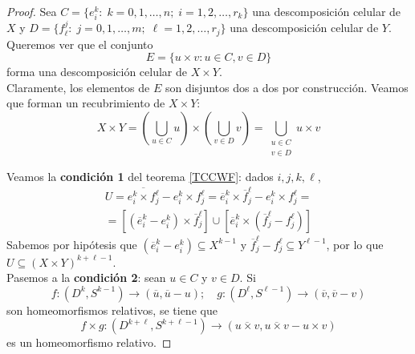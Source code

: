 \begin{proof}
Sea $C=\{e_i^k:\; k=0,1,\dots,n; \;i=1,2,\dots,r_k\}$ una descomposición celular de $X$ y $D=\{f_\ell^j:\; j=0,1,\dots,m; \;\ell=1,2,\dots,r_j\}$ una descomposición celular de $Y$. Queremos ver que el conjunto $$E=\{u\times v: u\in C, v\in D\}$$ forma una descomposición celular de $X\times Y$.
\\

Claramente, los elementos de $E$ son disjuntos dos a dos por construcción. Veamos que forman un recubrimiento de $X\times Y$: $$X\times Y=\left(\bigcup_{u \in C}u\right)\times\left(\bigcup_{v \in D}v\right)=\bigcup_{\substack{u \in C\\v \in D}}u\times v$$

Veamos la \textbf{condición 1} del teorema \ref{TCCWF}: dados $i,j,k,\ell$, \begin{multline*}
U=\overline{e^k_i\times f^\ell_j}-e^k_i\times f^\ell_j=\overline{e}^k_i\times \overline{f}^\ell_j-e^k_i\times f^\ell_j=\\=[(\overline{e}^k_i-e^k_i)\times \overline{f}^\ell_j]\cup[\overline{e}^k_i\times (\overline{f}^\ell_j-f^\ell_j)] \end{multline*} Sabemos por hipótesis que $(\overline{e}^k_i-e^k_i) \subseteq X^{k-1}$ y $\overline{f}^\ell_j-f^\ell_j \subseteq Y^{\ell-1}$, por lo que $U \subseteq (X\times Y)^{k+\ell-1}$.
\\

Pasemos a la \textbf{condición 2}: sean $u \in C$ y $v \in D$. Si $$f: (D^k,S^{k-1}) \longrightarrow (\overline{u},\overline{u}-u); \quad g: (D^\ell,S^{\ell-1}) \longrightarrow (\overline{v},\overline{v}-v)$$ son homeomorfismos relativos, se tiene que $$f\times g: (D^{k+\ell},S^{k+\ell-1}) \longrightarrow (\overline{u\times v},\overline{u\times v}-u\times v)$$ es un homeomorfismo relativo.\end{proof}

